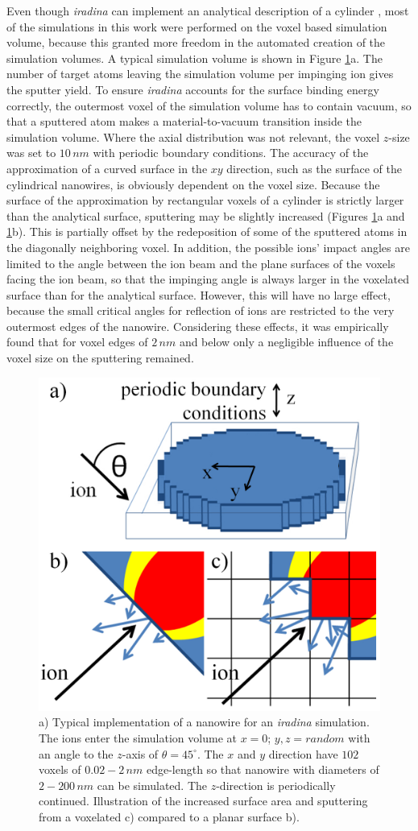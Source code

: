 Even though \emph{iradina} can implement an analytical description of a cylinder \cite{borschel_ion-solid_2012}, most of the simulations in this work were performed on the voxel based simulation volume, because this granted more freedom in the automated creation of the simulation volumes. A typical simulation volume is shown in Figure \ref{voxel}a. The number of target atoms leaving the simulation volume per impinging ion gives the sputter yield. To ensure \emph{iradina} accounts for the surface binding energy correctly, the outermost voxel of the simulation volume has to contain vacuum, so that a sputtered atom makes a material-to-vacuum transition inside the simulation volume. Where the axial distribution was not relevant, the voxel $z$-size was set to $10\,nm$ with periodic boundary conditions. The accuracy of the approximation of a curved surface in the $xy$ direction, such as the surface of the cylindrical nanowires, is obviously dependent on the voxel size. Because the surface of the approximation by rectangular voxels of a cylinder is strictly larger than the analytical surface, sputtering may be slightly increased (Figures \ref{voxel}a and \ref{voxel}b). This is partially offset by the redeposition of some of the sputtered atoms in the diagonally neighboring voxel. In addition, the possible ions' impact angles are limited to the angle between the ion beam and the plane surfaces of the voxels facing the ion beam, so that the impinging angle is always larger in the voxelated surface than for the analytical surface. However, this will have no large effect, because the small critical angles for reflection of ions are restricted to the very outermost edges of the nanowire. Considering these effects, it was empirically found that for voxel edges of $2\,nm$ and below only a negligible influence of the voxel size on the sputtering remained. 

\begin{figure}
	\centering
		\includegraphics[width=.5\textwidth]{images/voxel.jpg}
	\caption{a) Typical implementation of a nanowire for an \emph{iradina} simulation. The ions enter the simulation volume at $x=0$; $y,z=random$ with an angle to the $z$-axis of $\theta = 45^\circ$. The $x$ and $y$ direction have $102$ voxels of $0.02-2\,nm$ edge-length so that nanowire with diameters of $2-200\,nm$ can be simulated. The $z$-direction is periodically continued. Illustration of the increased surface area and sputtering from a voxelated c) compared to a planar surface b).}
	\label{voxel}
\end{figure} 

